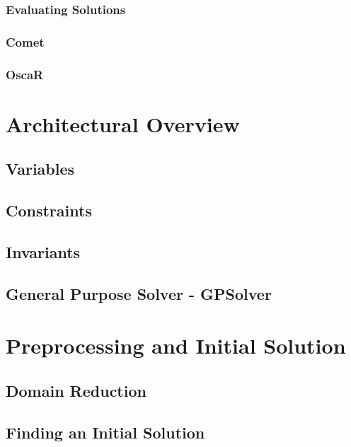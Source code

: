 \documentclass[a4paper,11pt]{article}
\begin{document}
    \subsubsection{Evaluating Solutions}
    
    \subsubsection{Comet}
    
    \subsubsection{OscaR}
    
 
\newpage
\section{Architectural Overview}  
  
  \subsection{Variables}
  
  \subsection{Constraints}
   \label{sub_cons}
    \subsection{Invariants}
  \label{sub_inv}

  \subsection{General Purpose Solver - GPSolver}
  \label{sub_gen}
  
\newpage
\section{Preprocessing and Initial Solution} \label{sec_gecode}
  
  \subsection{Domain Reduction}
  
  \subsection{Finding an Initial Solution}
   \label{sub_inisol}
\end{document}
